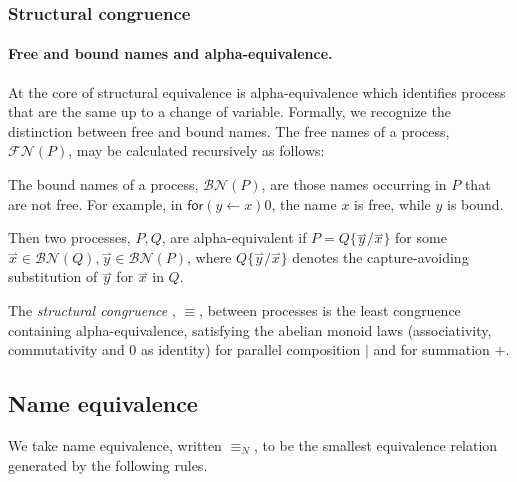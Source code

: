 \documentclass{llncs}
\newcommand{\pzero}{\mathbin{0}}
\newcommand{\nameeq}{\mathbin{\equiv_N}}
\newcommand{\freenames}[1]{\mathbin{\mathcal{FN}(#1)}}
\newcommand{\boundnames}[1]{\mathbin{\mathcal{BN}(#1)}}
\newcommand{\dropn}[1]{\mathsf{*}#1}
\newcommand{\vect}[1]{\stackrel{\rightharpoonup}{#1}}
\begin{document}
\subsubsection{Structural congruence}

\paragraph{Free and bound names and alpha-equivalence.} At the
core of structural equivalence is alpha-equivalence which identifies
process that are the same up to a change of variable. Formally, we
recognize the distinction between free and bound names. The free names
of a process, $\freenames{P}$, may be calculated recursively as
follows:


The bound names of a process, $\boundnames{P}$, are those names occurring in $P$
that are not free. For example, in $\mathsf{for}(y \leftarrow x)0$, the name $x$ is free, while $y$ is bound.

\begin{definition}
Then two processes, $P,Q$, are alpha-equivalent if $P = Q\{\vect{y}/\vect{x}\}$ for
some $\vect{x} \in \boundnames{Q},\vect{y} \in \boundnames{P}$, where $Q\{\vect{y}/\vect{x}\}$
denotes the capture-avoiding substitution of $\vect{y}$ for $\vect{x}$ in $Q$.
\end{definition}

\begin{definition}
  The {\em structural congruence} \cite{SangiorgiWalker} , $\equiv$,
  between processes is the least congruence containing
  alpha-equivalence, satisfying the abelian monoid laws
  (associativity, commutativity and $\pzero$ as identity) for parallel
  composition $|$ and for summation $+$.
\end{definition}

\subsection{Name equivalence}

We take name equivalence, written $\nameeq$, to be the smallest
equivalence relation generated by the following rules.
\end{document}
